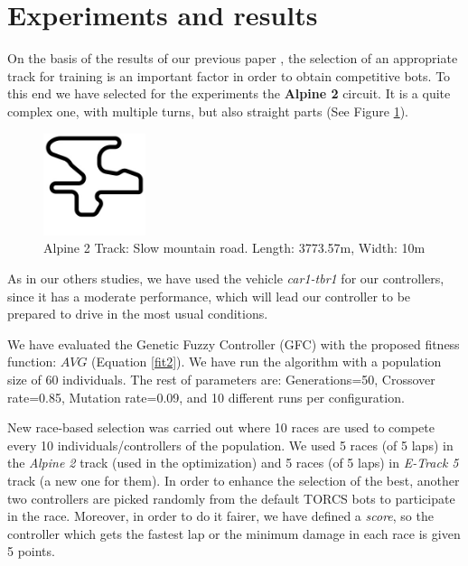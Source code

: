 \documentclass[conference]{IEEEtran}
\begin{document}

\section{Experiments and results}  
\label{sec:results}


On the basis of the results of our previous paper \cite{salem_cig2018}, the selection of an appropriate track for training is an important factor in order to obtain competitive bots. To this end we have selected for the experiments the \textbf{Alpine 2} circuit. It is a quite complex one, with multiple turns, but also straight parts (See Figure \ref{fig:alpine2_track}).

\begin{figure}[!ht]	
  \begin{center}
    \includegraphics[width=3cm]{fig/alpine2.jpg}
    \caption{Alpine 2 Track: Slow mountain road. Length: 3773.57m, Width: 10m}
    \label{fig:alpine2_track}	
  \end{center}	
\end{figure}

As in our others studies, we have used the vehicle \textit{car1-tbr1} for our controllers, since it has a moderate performance, which will lead our controller to be prepared to drive in the most usual conditions.

We have evaluated the Genetic Fuzzy Controller (GFC) with the proposed fitness function: $AVG$ (Equation \ref{fit2}). We have run the algorithm with a population size of 60 individuals. The rest of parameters are: Generations=50, Crossover rate=0.85, Mutation rate=0.09, and 10 different runs per configuration.

New race-based selection was carried out where 10 races are used to compete every 10 individuals/controllers of the population.
We used 5 races (of 5 laps) in the \textit{Alpine 2} track (used in the optimization) and 5 races (of 5 laps) in \textit{E-Track 5} track (a new one for them). 
In order to enhance the selection of the best, another two controllers are picked randomly from the default TORCS bots to participate in the race. Moreover, in order to do it fairer, we have defined a \textit{score}, so the controller which gets the fastest lap or the minimum damage in each race is given 5 points.
\end{document}

